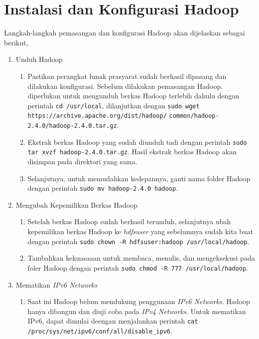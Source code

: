 
\chapter{Instalasi dan Konfigurasi Hadoop}
\label{appendix:C}

Langkah-langkah pemasangan dan konfigurasi Hadoop akan dijelaskan sebagai berikut,

\begin{enumerate}
  \item Unduh Hadoop
  \begin{enumerate}
    \item Pastikan perangkat lunak prasyarat sudah berhasil dipasang dan dilakukan konfigurasi. Sebelum dilakukan pemasangan Hadoop, diperlukan untuk mengunduh berkas Hadoop terlebih dahulu dengan perintah \verb|cd /usr/local|, dilanjutkan dengan \verb|sudo wget https://archive.apache.org/dist/hadoop/|
    \newline \verb|common/hadoop-2.4.0/hadoop-2.4.0.tar.gz|.
    \item Ekstrak berkas Hadoop yang sudah diunduh tadi dengan perintah \verb|sudo tar xvzf hadoop-2.4.0.tar.gz|. Hasil ekstrak berkas Hadoop akan disimpan pada direktori yang sama.
    \item Selanjutnya, untuk memudahkan kedepannya, ganti nama folder Hadoop dengan perintah \verb|sudo mv hadoop-2.4.0 hadoop|.
  \end{enumerate}
  \item Mengubah Kepemilikan Berkas Hadoop
  \begin{enumerate}
    \item Setelah berkas Hadoop sudah berhasil terunduh, selanjutnya ubah kepemilikan berkas Hadoop ke \textit{hdfsuser} yang sebelumnya sudah kita buat dengan perintah \verb|sudo chown -R hdfsuser:hadoop /usr/local/hadoop|.
    \item Tambahkan kekuasaaan untuk membaca, menulis, dan mengeksekusi pada foler Hadoop dengan perintah \verb|sudo chmod -R 777 /usr/local/hadoop|.
  \end{enumerate}
  \item Mematikan \textit{IPv6 Networks}
  \begin{enumerate}
    \item Saat ini Hadoop belum mendukung penggunaan \textit{IPv6 Networks}. Hadoop hanya dibangun dan diuji coba pada \textit{IPv4 Networks}. Untuk mematikan IPv6, dapat dimulai deengan menjalankan perintah \verb|cat /proc/sys/net/ipv6/conf/all/disable_ipv6|.

\end{enumerate}
\end{enumerate}

